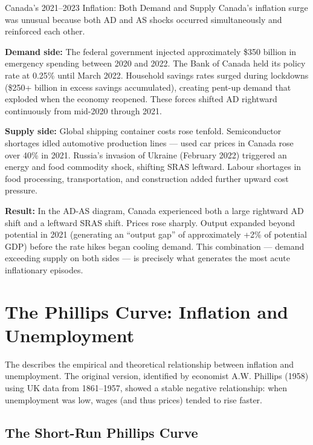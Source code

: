 \begin{canexample}{Canada's 2021--2023 Inflation: Both Demand and Supply}
Canada's inflation surge was unusual because both AD and AS shocks
occurred simultaneously and reinforced each other.

\textbf{Demand side:} The federal government injected approximately
\$350 billion in emergency spending between 2020 and 2022. The Bank of
Canada held its policy rate at 0.25\% until March 2022. Household savings
rates surged during lockdowns (\$250+ billion in excess savings accumulated),
creating pent-up demand that exploded when the economy reopened. These
forces shifted AD rightward continuously from mid-2020 through 2021.

\textbf{Supply side:} Global shipping container costs rose tenfold.
Semiconductor shortages idled automotive production lines --- used car
prices in Canada rose over 40\% in 2021. Russia's invasion of Ukraine
(February 2022) triggered an energy and food commodity shock, shifting
SRAS leftward. Labour shortages in food processing, transportation, and
construction added further upward cost pressure.

\textbf{Result:} In the AD-AS diagram, Canada experienced both a large
rightward AD shift and a leftward SRAS shift. Prices rose sharply. Output
expanded beyond potential in 2021 (generating an ``output gap'' of
approximately +2\% of potential GDP) before the rate hikes began
cooling demand. This combination --- demand exceeding supply on both
sides --- is precisely what generates the most acute inflationary episodes.
\end{canexample}

\section{The Phillips Curve: Inflation and Unemployment}
\label{sec:phillips_curve}

The  describes the empirical and theoretical
relationship between inflation and unemployment. The original version,
identified by economist A.W. Phillips (1958) using UK data from 1861--1957,
showed a stable negative relationship: when unemployment was low, wages
(and thus prices) tended to rise faster.

\subsection{The Short-Run Phillips Curve}

